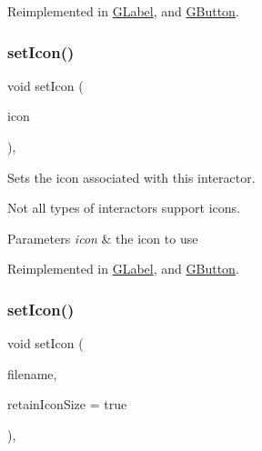 Reimplemented in \mbox{\hyperlink{classsgl_1_1GLabel_acca97b6c6330abded1c80521c9aca3a6}{G\+Label}}, and \mbox{\hyperlink{classsgl_1_1GButton_acca97b6c6330abded1c80521c9aca3a6}{G\+Button}}.

\mbox{\label{classsgl_1_1GInteractor_a368e1a338f84401c284506d03b1ba769}} 
\subsubsection{\texorpdfstring{set\+Icon()}{setIcon()}\hspace{0.1cm}{\footnotesize\ttfamily [2/3]}}
{\footnotesize\ttfamily void set\+Icon (\begin{DoxyParamCaption}\item[{const Q\+Pixmap \&}]{icon }\end{DoxyParamCaption})\hspace{0.3cm}{\ttfamily [virtual]}, {\ttfamily [inherited]}}



Sets the icon associated with this interactor. 

Not all types of interactors support icons. 
\begin{DoxyParams}{Parameters}
{\em icon} & the icon to use \\
\hline
\end{DoxyParams}


Reimplemented in \mbox{\hyperlink{classsgl_1_1GLabel_acb5275b880ff622d306f8f33428b4e34}{G\+Label}}, and \mbox{\hyperlink{classsgl_1_1GButton_acb5275b880ff622d306f8f33428b4e34}{G\+Button}}.

\mbox{\label{classsgl_1_1GInteractor_a762e139aa311461c3984d3ad28293f64}} 
\subsubsection{\texorpdfstring{set\+Icon()}{setIcon()}\hspace{0.1cm}{\footnotesize\ttfamily [3/3]}}
{\footnotesize\ttfamily void set\+Icon (\begin{DoxyParamCaption}\item[{const std\+::string \&}]{filename,  }\item[{bool}]{retain\+Icon\+Size = {\ttfamily true} }\end{DoxyParamCaption})\hspace{0.3cm}{\ttfamily [virtual]}, {\ttfamily [inherited]}}



